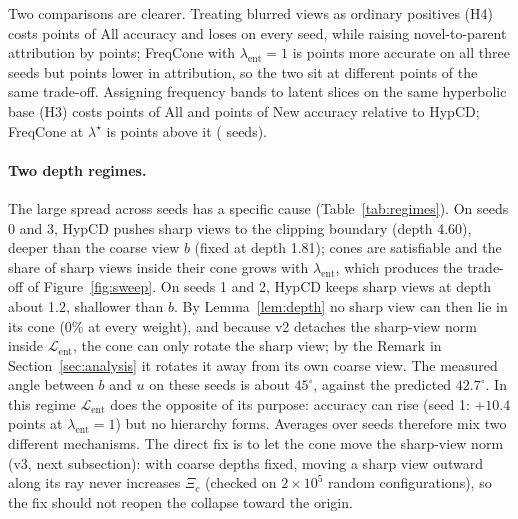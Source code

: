 \documentclass[10pt]{article}
\newcommand{\Lb}{\mathcal{L}}
\begin{document}
Two comparisons are clearer. Treating blurred views as ordinary positives (H4) costs \dAllNaive{} points of All
accuracy and loses on every seed, while raising novel-to-parent attribution by \dNtpNaive{} points; FreqCone with
$\lambda_{\mathrm{ent}}=1$ is \pairWoneVsNaiveAll{} points more accurate on all three seeds but
\pairWoneVsNaiveNtp{} points lower in attribution, so the two sit at different points of the same trade-off.
Assigning frequency bands to latent slices on the same hyperbolic base (H3) costs \dAllFour{} points of All
and \dNewFour{} points of New accuracy relative to HypCD; FreqCone at $\lambda^\star$ is \pairSelVsFourAll{}
points above it (\pairwSelVsFourAll{} seeds).

\paragraph{Two depth regimes.} The large spread across seeds has a specific cause (Table~\ref{tab:regimes}).
On seeds 0 and 3, HypCD pushes sharp views to the clipping boundary (depth 4.60), deeper than the coarse view
$b$ (fixed at depth 1.81); cones are satisfiable and the share of sharp views inside their cone grows with
$\lambda_{\mathrm{ent}}$, which produces the trade-off of Figure~\ref{fig:sweep}. On seeds 1 and 2, HypCD keeps
sharp views at depth about 1.2, shallower than $b$. By Lemma~\ref{lem:depth} no sharp view can then lie in its
cone (0\% at every weight), and because v2 detaches the sharp-view norm inside $\Lb_{\mathrm{ent}}$, the cone can
only rotate the sharp view; by the Remark in Section~\ref{sec:analysis} it rotates it away from its own coarse
view. The measured angle between $b$ and $u$ on these seeds is about $45^\circ$, against the predicted
$42.7^\circ$. In this regime $\Lb_{\mathrm{ent}}$ does the opposite of its purpose: accuracy can rise (seed 1:
$+10.4$ points at $\lambda_{\mathrm{ent}}=1$) but no hierarchy forms. Averages over seeds therefore mix two
different mechanisms. The direct fix is to let the cone move the sharp-view norm (v3, next subsection): with
coarse depths fixed, moving a sharp view outward along its ray never increases $\Xi_c$ (checked on
$2\times10^5$ random configurations), so the fix should not reopen the collapse toward the origin.

\begin{table}[t]
\centering\small
{}
\caption{Per-seed diagnostics of FreqCone v2. $\delta_c(u)$ is the mean depth of sharp views (the coarse view
$b$ sits at 1.81); ``in cone'' is the share of sharp views inside the cone of their coarse view $b$; $\Delta$ are
differences to HypCD on the same seed, in points.}\label{tab:regimes}
\end{table}
\end{document}
